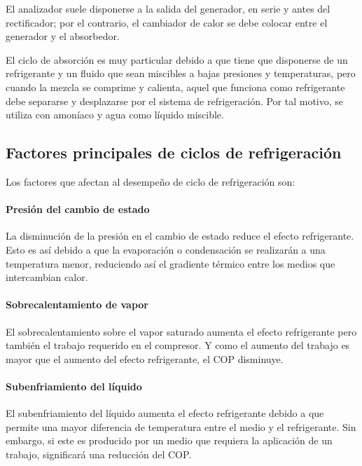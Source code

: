 	El analizador suele disponerse a la salida del generador, en serie y antes del rectificador; por el contrario, el cambiador de calor se debe colocar entre el generador y el absorbedor. 

	El ciclo de absorción es muy particular debido a que tiene que disponerse de un refrigerante y un fluido que sean miscibles a bajas presiones y temperaturas, pero cuando la mezcla se comprime y calienta, aquel que funciona como refrigerante debe separarse y desplazarse por el sistema de refrigeración. Por tal motivo, se utiliza con amoníaco y agua como líquido miscible.


	\subsection{Factores principales de ciclos de refrigeración}

	Los factores que afectan al desempeño de ciclo de refrigeración son:

	\paragraph{Presión del cambio de estado} La disminución de la presión en el cambio de estado reduce el efecto refrigerante. Esto es así debido a que la evaporación o condensación se realizarán a una temperatura menor, reduciendo así el gradiente térmico entre los medios que intercambian calor.  

	\paragraph{Sobrecalentamiento de vapor} El sobrecalentamiento sobre el vapor saturado aumenta el efecto refrigerante pero también el trabajo requerido en el compresor. Y como el aumento del trabajo es mayor que el aumento del efecto refrigerante, el COP disminuye.

	\paragraph{Subenfriamiento del líquido} El subenfriamiento del líquido aumenta el efecto refrigerante debido a que permite una mayor diferencia de temperatura entre el medio y el refrigerante. Sin embargo, si este es producido por un medio que requiera la aplicación de un trabajo, significará una reducción del COP.

